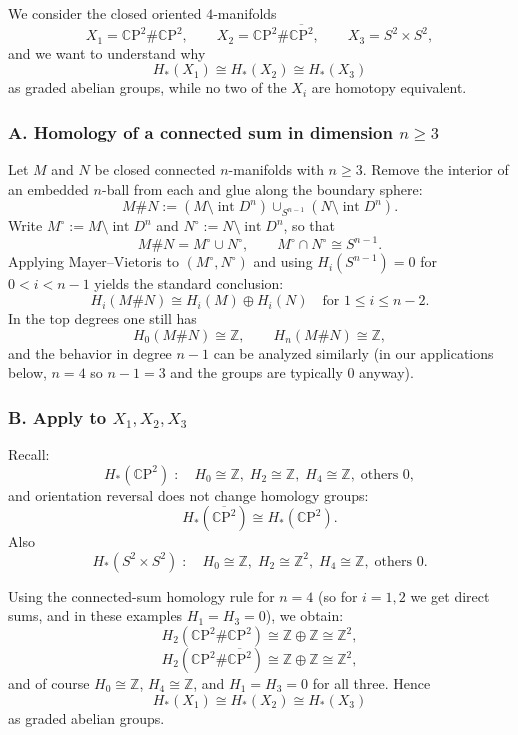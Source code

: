 \documentclass[12pt,a4paper]{article}
\theoremstyle{notespace}
\newcommand{\CP}{\mathbb{C}\mathrm{P}}
\begin{document}
We consider the closed oriented $4$-manifolds
\[
X_1=\CP^2\#\CP^2,\qquad
X_2=\CP^2\#\overline{\CP^2},\qquad
X_3=S^2\times S^2,
\]
and we want to understand why
\[
H_*(X_1)\cong H_*(X_2)\cong H_*(X_3)
\]
as graded abelian groups, while no two of the $X_i$ are homotopy equivalent.

\subsubsection{A. Homology of a connected sum in dimension $n\ge 3$}

Let $M$ and $N$ be closed connected $n$-manifolds with $n\ge 3$. Remove the interior of an embedded $n$-ball from each and glue along the boundary sphere:
\[
M\# N := (M\setminus \operatorname{int}D^n)\cup_{S^{n-1}}(N\setminus \operatorname{int}D^n).
\]
Write $M^\circ:=M\setminus \operatorname{int}D^n$ and $N^\circ:=N\setminus \operatorname{int}D^n$, so that
\[
M\# N = M^\circ \cup N^\circ,\qquad M^\circ\cap N^\circ \cong S^{n-1}.
\]
Applying Mayer--Vietoris to $(M^\circ, N^\circ)$ and using $H_i(S^{n-1})=0$ for $0<i<n-1$ yields the standard conclusion:
\[
H_i(M\#N)\cong H_i(M)\oplus H_i(N)\quad \text{for }1\le i\le n-2.
\]
In the top degrees one still has
\[
H_0(M\#N)\cong \mathbb Z,\qquad H_n(M\#N)\cong \mathbb Z,
\]
and the behavior in degree $n-1$ can be analyzed similarly (in our applications below, $n=4$ so $n-1=3$ and the groups are typically $0$ anyway).

\subsubsection{B. Apply to $X_1,X_2,X_3$}

Recall:
\[
H_*(\CP^2)\;:\quad H_0\cong \mathbb Z,\; H_2\cong \mathbb Z,\; H_4\cong \mathbb Z,\;\text{others }0,
\]
and orientation reversal does not change homology groups:
\[
H_*(\overline{\CP^2})\cong H_*(\CP^2).
\]
Also
\[
H_*(S^2\times S^2)\;:\quad H_0\cong \mathbb Z,\; H_2\cong \mathbb Z^2,\; H_4\cong \mathbb Z,\;\text{others }0.
\]

Using the connected-sum homology rule for $n=4$ (so for $i=1,2$ we get direct sums, and in these examples $H_1=H_3=0$), we obtain:
\[
H_2(\CP^2\#\CP^2)\cong \mathbb Z\oplus \mathbb Z\cong \mathbb Z^2,
\]
\[
H_2(\CP^2\#\overline{\CP^2})\cong \mathbb Z\oplus \mathbb Z\cong \mathbb Z^2,
\]
and of course $H_0\cong \mathbb Z$, $H_4\cong \mathbb Z$, and $H_1=H_3=0$ for all three. Hence
\[
H_*(X_1)\cong H_*(X_2)\cong H_*(X_3)
\]
as graded abelian groups.
\end{document}
